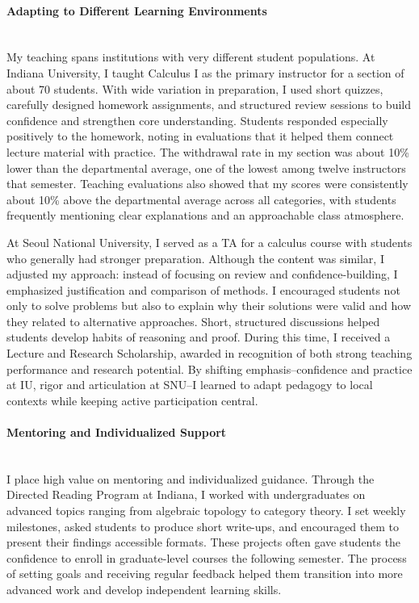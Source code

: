\documentclass[11pt]{article}
\begin{document}
\paragraph{Adapting to Different Learning Environments} \quad \\
My teaching spans institutions with very different student populations.
At Indiana University, I taught Calculus I as the primary instructor for a section of about 70 students.
With wide variation in preparation, I used short quizzes, carefully designed homework assignments, and structured review sessions to build confidence and strengthen core understanding. 
Students responded especially positively to the homework, noting in evaluations that it helped them connect lecture material with practice.
The withdrawal rate in my section was about 10\% lower than the departmental average, one of the lowest among twelve instructors that semester. Teaching evaluations also showed that my scores were consistently about 10\% above the departmental average across all categories, with students frequently mentioning clear explanations and an approachable class atmosphere.

At Seoul National University, I served as a TA for a calculus course with students who generally had stronger preparation. 
Although the content was similar, I adjusted my approach: instead of focusing on review and confidence-building, I emphasized justification and comparison of methods. 
I encouraged students not only to solve problems but also to explain why their solutions were valid and how they related to alternative approaches. 
Short, structured discussions helped students develop habits of reasoning and proof. 
During this time, I received a Lecture and Research Scholarship, awarded in recognition of both strong teaching performance and research potential.
By shifting emphasis--confidence and practice at IU, rigor and articulation at SNU--I learned to adapt pedagogy to local contexts while keeping active participation central.


\paragraph{Mentoring and Individualized Support}\quad \\
I place high value on mentoring and individualized guidance.
Through the Directed Reading Program at Indiana, I worked with undergraduates on advanced topics ranging from algebraic topology to category theory.
I set weekly milestones, asked students to produce short write-ups, and encouraged them to present their findings accessible formats.
These projects often gave students the confidence to enroll in graduate-level courses the following semester.
The process of setting goals and receiving regular feedback helped them transition into more advanced work and develop independent learning skills.
\end{document}
